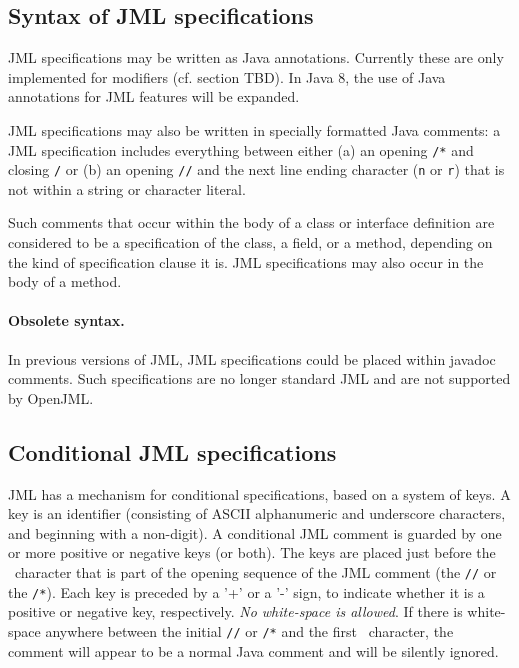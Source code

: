 \subsection{Syntax of JML specifications}

JML specifications may be written as Java annotations. Currently these are only implemented for modifiers (cf. section TBD). In Java 8, the use of Java annotations for JML features will be expanded.

JML specifications may also be written in specially formatted Java comments:
a JML specification includes everything between either (a) an opening {\tt /*\at} and closing {\tt */}
or (b) an opening {\tt //\at} and the next line ending character ({\tt \bs n}
or {\tt \bs r}) that is not within a string or character literal.

Such comments that occur within the body of a class or interface definition are
considered to be a specification of the class, a field, or a method, depending on the
kind of specification clause it is. JML specifications may also occur in the body of 
a method.

\paragraph{Obsolete syntax.} In previous versions of JML, JML specifications could be placed
within javadoc comments. Such specifications are no longer standard JML and are not supported by OpenJML.

\subsection{Conditional JML specifications}

JML has a mechanism for conditional specifications, based on a system of keys.
A key is an identifier (consisting of ASCII alphanumeric and underscore characters, and beginning with a non-digit).
A conditional JML comment is guarded by one or more positive or negative keys (or both).
The keys are placed just before the \at~character that is part of the opening sequence of the JML comment
(the {\tt //\at} or the {\tt /*\at}). Each key is preceded by a '+' or a '-' sign, to indicate whether it is a positive
or negative key, respectively. {\it No white-space is allowed}. If there is white-space anywhere between the
initial {\tt //} or {\tt /*} and the first \at~character, the comment will appear to be a normal Java comment and will be
silently ignored.


